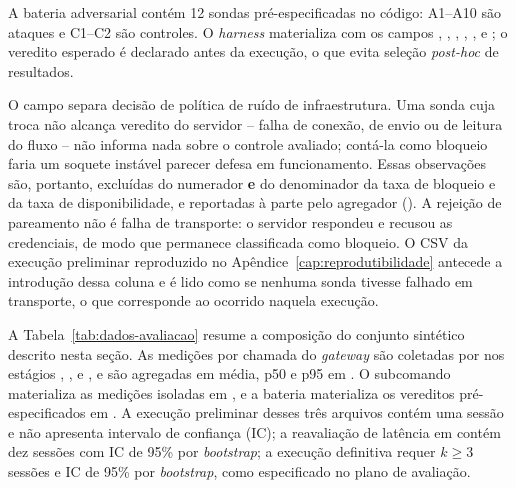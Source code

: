 A bateria adversarial contém 12 sondas pré-especificadas no código: A1--A10 são ataques e C1--C2 são controles. O \textit{harness} materializa  com os campos , , , , ,  e ; o veredito esperado é declarado antes da execução, o que evita seleção \textit{post-hoc} de resultados.

O campo  separa decisão de política de ruído de infraestrutura. Uma sonda cuja troca não alcança veredito do servidor -- falha de conexão, de envio ou de leitura do fluxo -- não informa nada sobre o controle avaliado; contá-la como bloqueio faria um soquete instável parecer defesa em funcionamento. Essas observações são, portanto, excluídas do numerador \textbf{e} do denominador da taxa de bloqueio e da taxa de disponibilidade, e reportadas à parte pelo agregador (). A rejeição de pareamento não é falha de transporte: o servidor respondeu e recusou as credenciais, de modo que permanece classificada como bloqueio. O CSV da execução preliminar reproduzido no Apêndice~\ref{cap:reprodutibilidade} antecede a introdução dessa coluna e é lido como se nenhuma sonda tivesse falhado em transporte, o que corresponde ao ocorrido naquela execução.

A Tabela~\ref{tab:dados-avaliacao} resume a composição do conjunto sintético descrito nesta seção. As medições por chamada do \textit{gateway} são coletadas por  nos estágios , ,  e , e são agregadas em média, p50 e p95 em . O subcomando  materializa as medições isoladas em , e a bateria materializa os vereditos pré-especificados em . A execução preliminar desses três arquivos contém uma sessão e não apresenta intervalo de confiança (IC); a reavaliação de latência em  contém dez sessões com IC de 95\% por \textit{bootstrap}; a execução definitiva requer $k\geq3$ sessões e IC de 95\% por \textit{bootstrap}, como especificado no plano de avaliação.

